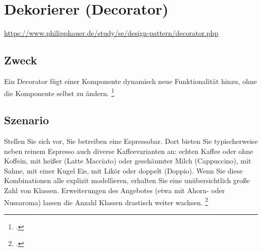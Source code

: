 \documentclass{lehramt-informatik-haupt}
\begin{document}

\chapter{Dekorierer (Decorator)}

\begin{quellen}
\item \cite{wiki:dekorierer}
\item \cite[Seite 149-156]{gof}
\item \url{https://www.philipphauer.de/study/se/design-pattern/decorator.php}
\item \cite[Kapitel 8.5.2, Seite 274-278]{schatten}
\item \cite[Seite 274]{schatten}
\item \cite[Kapitel 5.3, Seite 83-86]{eilebrecht}
\item \cite[Kapitel 22, Seite 269]{siebler}
\end{quellen}

%

\section{Zweck}

Ein Decorator fügt einer Komponente dynamisch neue Funktionalität
hinzu, ohne die Komponente selbst zu ändern.
\footcite[Seite 83]{eilebrecht}

\section{Szenario}

Stellen Sie sich vor, Sie betreiben eine Espressobar. Dort bieten Sie
typischerweise neben reinem Espresso auch diverse Kaffeevarianten an:
echten Kaffee oder ohne Koffein, mit heißer (Latte Macciato) oder
geschäumter Milch (Cappuccino), mit Sahne, mit einer Kugel Eis, mit
Likör oder doppelt (Doppio). Wenn Sie diese Kombinationen alle explizit
modellieren, erhalten Sie eine unübersichtlich große Zahl von Klassen.
Erweiterungen des Angebotes (etwa mit Ahorn- oder Nussaroma) lassen die
Anzahl Klassen drastisch weiter wachsen.
\footcite[Seite 83]{eilebrecht}

%
\end{document}
